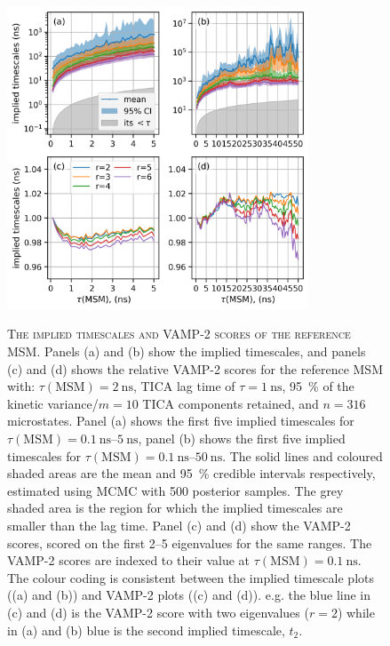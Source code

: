 \begin{figure}
    \centering
    \caption[The implied timescales and VAMP-2 scores of the reference MSM]{\textsc{The implied timescales and VAMP-2 scores of the reference MSM}. Panels (a) and (b) show the implied timescales, and panels (c) and (d) shows the relative VAMP-2 scores for the reference MSM with: $\tau(\textrm{MSM})=\SI{2}{\nano\second}$, TICA lag time of $\tau=\SI{1}{\nano\second}$, \SI{95}{\percent} of the kinetic variance/$m=10$ TICA components retained, and $n=316$ microstates. Panel (a) shows the first five implied timescales for $\tau(\mathrm{MSM})=\SIrange[range-phrase=--]{0.1}{5}{\nano\second}$, panel (b) shows the first five implied timescales for $\tau(\mathrm{MSM}) = \SIrange[range-phrase=--]{0.1}{50}{\nano\second}$. The solid lines and coloured shaded areas are the mean and \SI{95}{\percent} credible intervals respectively, estimated using MCMC with \num{500} posterior samples. The grey shaded area is the region for which the implied timescales are smaller than the lag time. Panel (c) and (d) show the VAMP-2 scores, scored on the first \numrange{2}{5} eigenvalues for the same ranges. The VAMP-2 scores are indexed to their value at $\tau(\mathrm{MSM})=\SI{0.1}{\nano\second}$. The colour coding is consistent between the implied timescale plots ((a) and (b)) and VAMP-2 plots ((c) and (d)). e.g. the blue line in (c) and (d) is the VAMP-2 score with two eigenvalues ($r=2$) while in (a) and (b) blue is the second implied timescale, $t_{2}$. }
    \includegraphics[width=0.8\textwidth]{chapters/aadh/figures/implied_timescales_D.png}
    \label{fig:its_d}
\end{figure}

